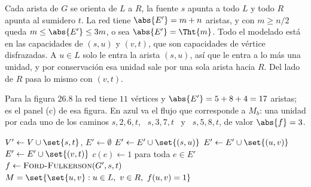 \documentclass[11pt,letterpaper]{article}
\begin{document}
Cada arista de $G$ se orienta de $L$ a $R$, la fuente $s$ apunta a
todo $L$ y todo $R$ apunta al sumidero $t$. La red tiene
$\abs{E'} = m + n$ aristas, y con $m \ge n/2$ queda
$m \le \abs{E'} \le 3m$, o sea $\abs{E'} = \Tht{m}$. Todo el modelado
está en las capacidades de $(s, u)$ y $(v, t)$, que son capacidades
de vértice disfrazadas. A $u \in L$ solo le entra la arista $(s, u)$,
así que le entra a lo más una unidad, y por conservación esa unidad
sale por una sola arista hacia $R$. Del lado de $R$ pasa lo mismo con
$(v, t)$.

Para la figura 26.8 la red tiene $11$ vértices y
$\abs{E'} = 5 + 8 + 4 = 17$ aristas; es el panel (c) de esa figura.
En azul va el flujo que corresponde a $M_b$: una unidad por cada uno
de los caminos $s, 2, 6, t$, \ $s, 3, 7, t$ \ y \ $s, 5, 8, t$, de
valor $\abs{f} = 3$.

\begin{center}
\end{center}

\begin{algorithm}[H]
\caption{\textsc{Emparejamiento-Bipartito}$(G, L, R)$}
\label{alg:emparejamiento-flujo}
\begin{algorithmic}[1]
  \State $V' \gets V \cup \set{s, t}$, \quad $E' \gets \emptyset$
    \State $E' \gets E' \cup \set{(s, u)}$
  \EndFor
    \State $E' \gets E' \cup \set{(u, v)}$ 
  \EndFor
    \State $E' \gets E' \cup \set{(v, t)}$
  \EndFor
  \State $c(e) \gets 1$ para toda $e \in E'$
  \State $f \gets \textsc{Ford-Fulkerson}(G', s, t)$
  \State \Return $M = \set{\set{u, v} : u \in L,\ v \in R,\
         f(u, v) = 1}$
\EndProcedure
\end{algorithmic}
\end{algorithm}
\end{document}
